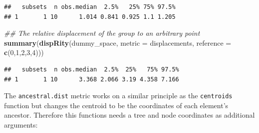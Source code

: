 \documentclass[]{book}
\newenvironment{Shaded}{\begin{snugshade}}{\end{snugshade}}
\newcommand{\CommentTok}[1]{\textcolor[rgb]{0.56,0.35,0.01}{\textit{#1}}}
\newcommand{\DataTypeTok}[1]{\textcolor[rgb]{0.13,0.29,0.53}{#1}}
\newcommand{\DecValTok}[1]{\textcolor[rgb]{0.00,0.00,0.81}{#1}}
\newcommand{\KeywordTok}[1]{\textcolor[rgb]{0.13,0.29,0.53}{\textbf{#1}}}
\newcommand{\NormalTok}[1]{#1}
\newcommand{\OperatorTok}[1]{\textcolor[rgb]{0.81,0.36,0.00}{\textbf{#1}}}
\newcommand{\OtherTok}[1]{\textcolor[rgb]{0.56,0.35,0.01}{#1}}
\newcommand{\StringTok}[1]{\textcolor[rgb]{0.31,0.60,0.02}{#1}}
\begin{document}
\begin{verbatim}
##   subsets  n obs.median  2.5%   25% 75% 97.5%
## 1       1 10      1.014 0.841 0.925 1.1 1.205
\end{verbatim}

\begin{Shaded}
\begin{Highlighting}[]
\CommentTok{## The relative displacement of the group to an arbitrary point}
\KeywordTok{summary}\NormalTok{(}\KeywordTok{dispRity}\NormalTok{(dummy_space, }\DataTypeTok{metric =}\NormalTok{ displacements,}
                 \DataTypeTok{reference =} \KeywordTok{c}\NormalTok{(}\DecValTok{0}\NormalTok{,}\DecValTok{1}\NormalTok{,}\DecValTok{2}\NormalTok{,}\DecValTok{3}\NormalTok{,}\DecValTok{4}\NormalTok{)))}
\end{Highlighting}
\end{Shaded}

\begin{verbatim}
##   subsets  n obs.median  2.5%  25%   75% 97.5%
## 1       1 10      3.368 2.066 3.19 4.358 7.166
\end{verbatim}

The \texttt{ancestral.dist} metric works on a similar principle as the \texttt{centroids} function but changes the centroid to be the coordinates of each element's ancestor.
Therefore this functions needs a tree and node coordinates as additional arguments:

\begin{Shaded}
\end{Shaded}
\end{document}
